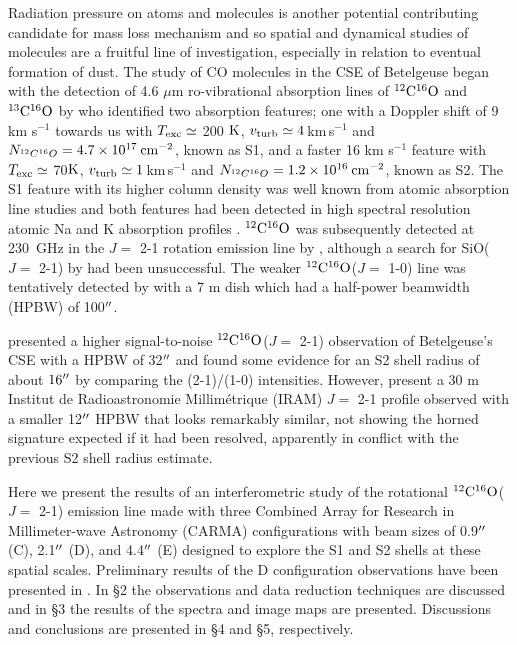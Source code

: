 \documentclass[iop]{emulateapj}
\begin{document}
Radiation pressure on atoms and molecules is another potential contributing candidate for mass loss mechanism and so spatial and dynamical studies of molecules are a fruitful line of investigation, especially in relation to eventual formation of dust. The study of CO molecules in the CSE of Betelgeuse began with the detection of 4.6 $\mu$m ro-vibrational absorption lines of $\rm{{}^{12}C^{16}O}$ and $\rm{{}^{13}C^{16}O}$ by \cite{1979ApJ...233L.135B} who identified two absorption features; one with a Doppler shift of 9 km s${}^{-1}$ towards us with $T_{\rm{exc}} \simeq$ 200 $\rm{K}$, $v_{\rm{turb}}\simeq 4$\,km\,s${}^{-1}$ and $N_{^{12}C^{16}O}=4.7\times 10^{17}\>{\rm cm}^{-2}$, known as S1, and a faster 16 km s${}^{-1}$ feature with $T_{\rm{exc}} \simeq$ 70$\rm{K}$, $v_{\rm{turb}}\simeq 1$\,km\,s${}^{-1}$ and $N_{^{12}C^{16}O}=1.2\times 10^{16}\>{\rm cm}^{-2}$, known as S2. The S1 feature with its higher column density was well known from atomic absorption line studies \citep[e.g.][]{1962ApJ...136..844W} and both features had been detected in high spectral resolution atomic Na and K absorption profiles \citep{1975ApJ...199..427G}. $\rm{{}^{12}C^{16}O}$ was subsequently detected at 230~GHz in the $J=$ 2-1 rotation emission line by \cite{1980ApJ...242L..25K}, although a search for SiO($J=$ 2-1) by \cite{1978ApJ...221..854L} had been unsuccessful. The weaker $\rm{{}^{12}C^{16}O}$($J=$ 1-0) line was tentatively detected by \cite{1985ApJ...292..640K} with a 7 m dish which had a half-power beamwidth (HPBW) of 100$\mbox{$^{\prime\prime}$}$.

\cite{1987ApJ...313..400H} presented a higher signal-to-noise $\rm{{}^{12}C^{16}O}$($J=$ 2-1) observation of Betelgeuse's CSE with a HPBW of 32$\mbox{$^{\prime\prime}$}$ and found some evidence for an S2 shell radius of about $16\mbox{$^{\prime\prime}$}$ by comparing the  (2-1)/(1-0) intensities. However, \cite{1994ApJ...424L.127H} present a 30 m Institut de Radioastronomie Millim\'etrique (IRAM) $J=$ 2-1 profile observed with a smaller 12$\mbox{$^{\prime\prime}$}$ HPBW that  looks remarkably similar, not showing the horned signature expected if it had been resolved, apparently in conflict with the previous S2 shell radius estimate.

Here we present the results of an interferometric study of the rotational $\rm{{}^{12}C^{16}O}$($J=$ 2-1) emission line made with three Combined Array for Research in Millimeter-wave Astronomy (CARMA) configurations with beam sizes of 0.9$\mbox{$^{\prime\prime}$}$ (C), 2.1$\mbox{$^{\prime\prime}$}$ (D), and 4.4$\mbox{$^{\prime\prime}$}$ (E) designed to explore the S1 and S2 shells at these spatial scales.  Preliminary results of the D configuration observations have been presented in \cite{2009AIPC.1094..868H}. In \S2 the observations and data reduction techniques are discussed and in \S3 the results of the spectra and image maps are presented. Discussions and conclusions are presented in \S4 and \S5, respectively.
\end{document}
